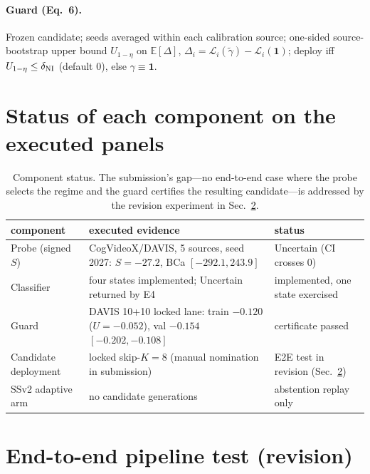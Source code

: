 \documentclass[letterpaper]{article}
\begin{document}
\paragraph{Guard (Eq.~6).} Frozen candidate; seeds averaged within each
calibration source; one-sided source-bootstrap upper bound $U_{1-\eta}$
on $\mathbb E[\Delta]$, $\Delta_i=\mathcal L_i(\tilde\gamma)-\mathcal L_i(\mathbf 1)$;
deploy iff $U_{1-\eta}\le\delta_{\rm NI}$ (default $0$), else
$\gamma\equiv\mathbf 1$.

\section{Status of each component on the executed panels}
\label{sec:supp-status}

\begin{table}[h]\centering\small
\begin{tabular}{@{}p{}p{}p{}@{}}
\toprule
component & executed evidence & status\\
\midrule
Probe (signed $S$) & CogVideoX/DAVIS, 5 sources, seed 2027: $S{=}-27.2$, BCa $[-292.1,243.9]$ & Uncertain (CI crosses 0)\\
Classifier & four states implemented; Uncertain returned by E4 & implemented, one state exercised\\
Guard & DAVIS 10+10 locked lane: train $-0.120$ ($U{=}-0.052$), val $-0.154$ $[-0.202,-0.108]$ & certificate passed\\
Candidate deployment & locked skip-$K{=}8$ (manual nomination in submission) & E2E test in revision (Sec.~\ref{sec:supp-e2e})\\
SSv2 adaptive arm & no candidate generations & abstention replay only\\
\bottomrule
\end{tabular}
\caption{Component status. The submission's gap---no end-to-end case
where the probe selects the regime and the guard certifies the
resulting candidate---is addressed by the revision experiment in
Sec.~\ref{sec:supp-e2e}.}
\end{table}

\section{End-to-end pipeline test (revision)}
\label{sec:supp-e2e}
\end{document}
